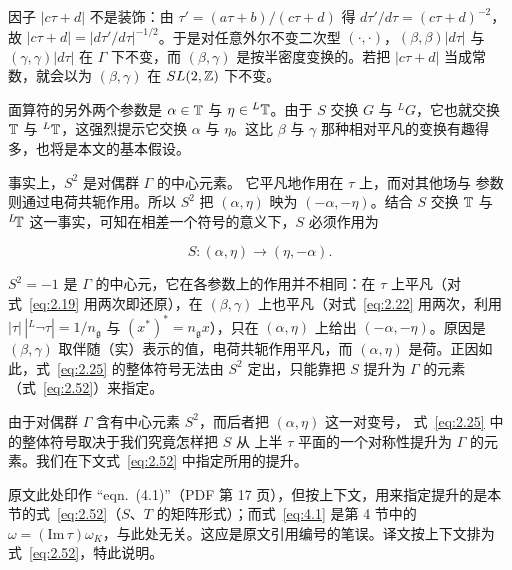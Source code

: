 \begin{yizhu}[易错点]
因子 $|c\tau+d|$ 不是装饰：由 $\tau'=(a\tau+b)/(c\tau+d)$ 得 $d\tau'/d\tau=(c\tau+d)^{-2}$，故 $|c\tau+d|=|d\tau'/d\tau|^{-1/2}$。于是对任意外尔不变二次型 $(\cdot,\cdot)$，$(\beta,\beta)|d\tau|$ 与 $(\gamma,\gamma)|d\tau|$ 在 $\Gamma$ 下不变，而 $(\beta,\gamma)$ 是按半密度变换的。若把 $|c\tau+d|$ 当成常数，就会以为 $(\beta,\gamma)$ 在 $SL(2,{\mathbb{Z}})$ 下不变。
\end{yizhu}

\bigskip{}

面算符的另外两个参数是 $\alpha\in {\mathbb{T}}$ 与 $\eta\in {}^L
{\mathbb{T}}$。由于 $S$ 交换 $G$ 与 $^LG$，它也就交换 ${\mathbb{T}}$ 与
$^L{\mathbb{T}}$，这强烈提示它交换 $\alpha$ 与
$\eta$。这比 $\beta$ 与
$\gamma$ 那种相对平凡的变换有趣得多，也将是本文的基本假设。

事实上，$S^2$ 是对偶群 $\Gamma$ 的中心元素。
它平凡地作用在 $\tau$ 上，而对其他场与
参数则通过电荷共轭作用。所以 $S^2$ 把 $(\alpha,\eta)$
映为 $(-\alpha,-\eta)$。结合 $S$ 交换
${\mathbb{T}}$ 与 $^L\negthinspace{\mathbb{T}}$ 这一事实，可知在相差一个符号的意义下，$S$ 必须作用为

\setcounter{equation}{24}
\begin{equation}\label{eq:2.25}
  S:(\alpha,\eta)\to (\eta,-\alpha).
\end{equation}

\begin{yizhu}[易错点]
$S^2=-1$ 是 $\Gamma$ 的中心元，它在各参数上的作用并不相同：在 $\tau$ 上平凡（对式~\eqref{eq:2.19} 用两次即还原），在 $(\beta,\gamma)$ 上也平凡（对式~\eqref{eq:2.22} 用两次，利用 $|\tau|\,|{}^L\neg\tau|=1/n_{\mathfrak g}$ 与 $(x^*)^*=n_{\mathfrak g}x$），只在 $(\alpha,\eta)$ 上给出 $(-\alpha,-\eta)$。原因是 $(\beta,\gamma)$ 取伴随（实）表示的值，电荷共轭作用平凡，而 $(\alpha,\eta)$ 是荷。正因如此，式~\eqref{eq:2.25} 的整体符号无法由 $S^2$ 定出，只能靠把 $S$ 提升为 $\Gamma$ 的元素（式~\eqref{eq:2.52}）来指定。
\end{yizhu}

由于对偶群 $\Gamma$ 含有中心元素
$S^2$，而后者把 $(\alpha,\eta)$ 这一对变号，
式~\eqref{eq:2.25} 中的整体符号取决于我们究竟怎样把 $S$ 从
上半 $\tau$ 平面的一个对称性提升为
$\Gamma$ 的元素。我们在下文式~\eqref{eq:2.52} 中指定所用的提升。

\begin{yizhu}[原文疑误]
原文此处印作 “eqn.~(4.1)”（PDF 第 17 页），但按上下文，用来指定提升的是本节的式~\eqref{eq:2.52}（$S$、$T$ 的矩阵形式）；而式~\eqref{eq:4.1} 是第 4 节中的 $\omega=(\mathrm{Im}\,\tau)\omega_K$，与此处无关。这应是原文引用编号的笔误。译文按上下文排为式~\eqref{eq:2.52}，特此说明。
\end{yizhu}

